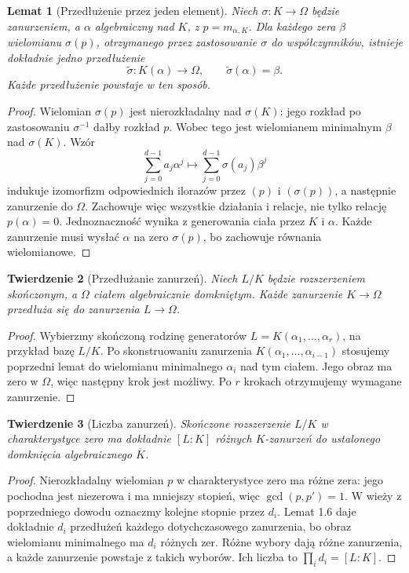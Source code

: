 \documentclass[11pt,a4paper,oneside]{book}
\numberwithin{equation}{section}
\theoremstyle{plain}
\newtheorem{twierdzenie}{Twierdzenie}[chapter]
\newtheorem{lemat}[twierdzenie]{Lemat}
\theoremstyle{definition}
\theoremstyle{remark}
\begin{document}
\begin{lemat}[Przedłużenie przez jeden element]
Niech $\sigma:K\to\Omega$ będzie zanurzeniem, a $\alpha$ algebraiczny nad $K$, z $p=m_{\alpha,K}$. Dla każdego zera $\beta$ wielomianu $\sigma(p)$, otrzymanego przez zastosowanie $\sigma$ do współczynników, istnieje dokładnie jedno przedłużenie
\[
\widetilde\sigma:K(\alpha)\longrightarrow\Omega,
\qquad \widetilde\sigma(\alpha)=\beta.
\]
Każde przedłużenie powstaje w ten sposób.
\end{lemat}
\begin{proof}
Wielomian $\sigma(p)$ jest nierozkładalny nad $\sigma(K)$: jego rozkład po zastosowaniu $\sigma^{-1}$ dałby rozkład $p$. Wobec tego jest wielomianem minimalnym $\beta$ nad $\sigma(K)$. Wzór
\[
\sum_{j=0}^{d-1}a_j\alpha^j\longmapsto
\sum_{j=0}^{d-1}\sigma(a_j)\beta^j
\]
indukuje izomorfizm odpowiednich ilorazów przez $(p)$ i $(\sigma(p))$, a następnie zanurzenie do $\Omega$. Zachowuje więc wszystkie działania i relacje, nie tylko relację $p(\alpha)=0$. Jednoznaczność wynika z generowania ciała przez $K$ i $\alpha$. Każde zanurzenie musi wysłać $\alpha$ na zero $\sigma(p)$, bo zachowuje równania wielomianowe.
\end{proof}

\begin{twierdzenie}[Przedłużanie zanurzeń]
Niech $L/K$ będzie rozszerzeniem skończonym, a $\Omega$ ciałem algebraicznie domkniętym. Każde zanurzenie $K\to\Omega$ przedłuża się do zanurzenia $L\to\Omega$.
\end{twierdzenie}
\begin{proof}
Wybierzmy skończoną rodzinę generatorów $L=K(\alpha_1,\dots,\alpha_r)$, na przykład bazę $L/K$. Po skonstruowaniu zanurzenia $K(\alpha_1,\dots,\alpha_{i-1})$ stosujemy poprzedni lemat do wielomianu minimalnego $\alpha_i$ nad tym ciałem. Jego obraz ma zero w $\Omega$, więc następny krok jest możliwy. Po $r$ krokach otrzymujemy wymagane zanurzenie.
\end{proof}

\begin{twierdzenie}[Liczba zanurzeń]
Skończone rozszerzenie $L/K$ w charakterystyce zero ma dokładnie $[L:K]$ różnych $K$-zanurzeń do ustalonego domknięcia algebraicznego $\overline K$.
\end{twierdzenie}
\begin{proof}
Nierozkładalny wielomian $p$ w charakterystyce zero ma różne zera: jego pochodna jest niezerowa i ma mniejszy stopień, więc $\gcd(p,p')=1$. W wieży z poprzedniego dowodu oznaczmy kolejne stopnie przez $d_i$. Lemat 1.6 daje dokładnie $d_i$ przedłużeń każdego dotychczasowego zanurzenia, bo obraz wielomianu minimalnego ma $d_i$ różnych zer. Różne wybory dają różne zanurzenia, a każde zanurzenie powstaje z takich wyborów. Ich liczba to $\prod_i d_i=[L:K]$.
\end{proof}
\end{document}
